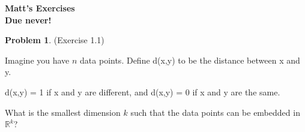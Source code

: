 \documentclass[12pt,oneside]{article}
\theoremstyle{definition}
\newtheorem{problem}{Problem}
\begin{document}
\pagestyle{fancy}


\begin{center}
\bf \Large
Matt's Exercises \\[0.5 em]
\large
Due never!
\end{center}

\bigskip



\begin{problem}
(Exercise 1.1)

Imagine you have $n$ data points. Define d(x,y) to be the distance between x and y. 

d(x,y) = 1 if x and y are different, and d(x,y) = 0 if x and y are the same.

What is the smallest dimension $k$ such that the data points can be embedded in $\mathbb{R}^k$?


\end{problem}
\end{document}

